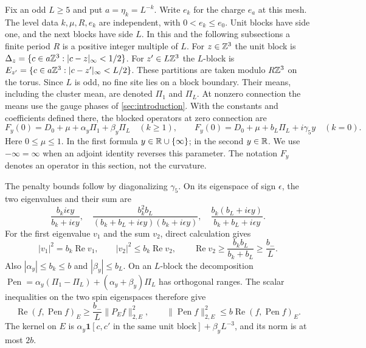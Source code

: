Fix an odd $L\ge5$ and put $a=\eta_k=L^{-k}$. Write $e_k$ for the
charge $e_a$ at this mesh. The level data $k,\mu,R,e_k$ are independent,
with $0<e_k\le e_0$.
Unit blocks have side
one, and the next blocks have side $L$. In this and the following
subsections a finite period $R$ is a positive integer multiple of $L$.
For $z\in\mathbb Z^3$ the unit block is
$\Delta_z=\{c\in a\mathbb Z^3:|c-z|_\infty<1/2\}$.
For $z'\in L\mathbb Z^3$ the $L$-block is
$E_{z'}=\{c\in a\mathbb Z^3:|c-z'|_\infty<L/2\}$.
These partitions are taken modulo $R\mathbb Z^3$ on the torus. Since $L$
is odd, no fine site lies on a block boundary. Their means, including
the cluster mean, are denoted $\Pi_1$ and $\Pi_L$. At nonzero connection
the means use the gauge phases of \cref{sec:introduction}.
With the constants and coefficients defined there, the blocked operators
at zero connection are
\begin{equation}\label{eq:blocked-zero-operator}
 F_y(0)=D_0+\mu+\alpha_y\Pi_1+\beta_y\Pi_L\quad(k\ge1),
 \qquad
 F_y(0)=D_0+\mu+b_L\Pi_L+i\gamma_5y\quad(k=0).
\end{equation}
Here $0\le\mu\le1$. In the first formula $y\in\mathbb R\cup\{\infty\}$;
in the second $y\in\mathbb R$. We use $-\infty=\infty$ when an adjoint
identity reverses this parameter. The notation $F_y$ denotes an operator in this
section, not the curvature.

The penalty bounds follow by diagonalizing $\gamma_5$. On its eigenspace
of sign $\epsilon$, the two eigenvalues and their sum are
\[
 \frac{b_ki\epsilon y}{b_k+i\epsilon y},\quad
 \frac{b_k^2b_L}{(b_k+b_L+i\epsilon y)(b_k+i\epsilon y)},\quad
 \frac{b_k(b_L+i\epsilon y)}{b_k+b_L+i\epsilon y}.
\]
For the first eigenvalue $v_1$ and the sum $v_2$, direct calculation gives
\[
 |v_1|^2=b_k\operatorname{Re}v_1,\qquad
 |v_2|^2\le b_k\operatorname{Re}v_2,\qquad
 \operatorname{Re}v_2\ge\frac{b_kb_L}{b_k+b_L}\ge\frac{b_-}{L}.
\]
Also $|\alpha_y|\le b_k\le b$ and $|\beta_y|\le b_L$.
On an $L$-block the decomposition
$\operatorname{Pen}=\alpha_y(\Pi_1-\Pi_L)+(\alpha_y+\beta_y)\Pi_L$
has orthogonal ranges. The scalar inequalities on the two spin
eigenspaces therefore give
\begin{equation}\label{eq:penalty-estimates}
 \operatorname{Re}(f,\operatorname{Pen}f)_E
      \ge\frac{b_-}{L}\|P_Ef\|_{2,E}^2,
 \qquad
 \|\operatorname{Pen}f\|_{2,E}^2
      \le b\operatorname{Re}(f,\operatorname{Pen}f)_E.
\end{equation}
The kernel on $E$ is
$\alpha_y\mathbf1[c,c'\text{ in the same unit block}]+\beta_yL^{-3}$,
and its norm is at most $2b$.

